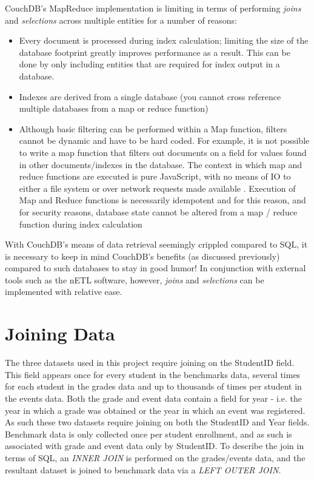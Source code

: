 \label{chapter-analysis}
CouchDB's MapReduce implementation is limiting in terms of performing \textit{joins} and \textit{selections} across multiple entities for a number of reasons:

\begin{itemize}
    \item Every document is processed during index calculation; limiting the size of the database footprint greatly improves performance as a result. This can be done by only including entities that are required for index output in a database.
    \item Indexes are derived from a single database (you cannot cross reference multiple databases from a map or reduce function)
    \item Although basic filtering can be performed within a Map function, filters cannot be dynamic and have to be hard coded. For example, it is not possible to write a map function that filters out documents on a field for values found in other documents/indexes in the database. The context in which map and reduce functions are executed is pure JavaScript, with no means of IO to either a file system or over network requests made available \cite{slack28Feb}. Execution of Map and Reduce functions is necessarily idempotent and for this reason, and for security reasons, database state cannot be altered from a map / reduce function during index calculation
\end{itemize}

With CouchDB's means of data retrieval seemingly crippled compared to SQL, it is necessary to keep in mind CouchDB's benefits (as discussed previously) compared to such databases to stay in good humor! In conjunction with external tools such as the nETL software, however, \textit{joins} and \textit{selections} can be implemented with relative ease.

\section{Joining Data}
The three datasets used in this project require joining on the StudentID field. This field appears once for every student in the benchmarks data, several times for each student in the grades data and up to thousands of times per student in the events data. Both the grade and event data contain a field for year - i.e. the year in which a grade was obtained or the year in which an event was registered. As such these two datasets require joining on both the StudentID and Year fields. Benchmark data is only collected once per student enrollment, and as such is associated with grade and event data only by StudentID. To describe the join in terms of SQL, an \textit{INNER JOIN} is performed on the grades/events data, and the resultant dataset is joined to benchmark data via a \textit{LEFT OUTER JOIN}.

